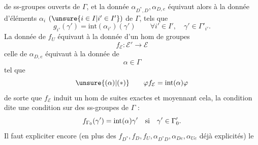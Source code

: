 

de ss-groupes ouverts de $\Gamma$,
et la donnée 
$\alpha_{D^*,D},\alpha_{D,e}$ équivaut alors
à la donnée d'éléments $\alpha_i$
$(\unsure{i\in I|i'\in I'})$ de $\Gamma$,
tels que
\[
g_{i'}(\gamma')=\mathrm{int}(\alpha_{i'})(\gamma')
\qquad\forall i'\in I',\quad\gamma'\in\Gamma'_{i'}.
\]
La donnée de $f_U$ équivaut à la donnée d'un hom de groupes
\[
\boxed{f_{\mathcal E}:\mathcal E'\to\mathcal E}
\]
celle de $\alpha_{D,e}$ équivaut à la donnée de
\[
\boxed{\alpha\in\Gamma}
\]
tel que
\[
\unsure{(\alpha)|(*)}\qquad
\varphi f_{\mathcal E}=\mathrm{int}(\alpha)\varphi
\]
de sorte que $f_{\mathcal E}$ induit un hom de suites exactes
et moyennant cela, la condition dite \unsure{$(\alpha)$|$(*)$}
 une condition sur des
 ss-groupes de $\Gamma$ :
\[
f_{\Gamma_0}(\gamma')=\mathrm{int}(\alpha)\gamma'
\quad\hbox{si}\quad\gamma'\in\Gamma'_0.
\]
Il faut expliciter encore (en plus des
$f_{D^*},f_D,f_U,\alpha_{D^*D},\alpha_{De},\alpha_{Ue}$
déjà explicités) le
